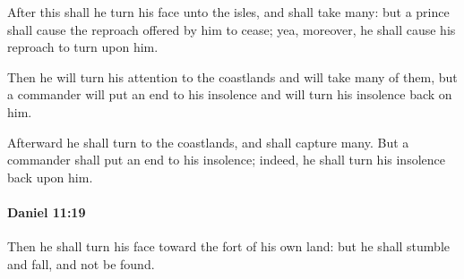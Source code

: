 			\begin{versebox}
					\item[BHS] 
					\item[LXX] 
					\item[ASV] After this shall he turn his face unto the isles, and shall take many: but a prince shall cause the reproach offered by him to cease; yea, moreover, he shall cause his reproach to turn upon him.
					\item[NIV] Then he will turn his attention to the coastlands and will take many of them, but a commander will put an end to his insolence and will turn his insolence back on him.
					\item[NRSV] Afterward he shall turn to the coastlands, and shall capture many. But a commander shall put an end to his insolence; indeed, he shall turn his insolence back upon him.
			\end{versebox}

		\paragraph{Daniel 11:19} %
			\label{DANIEL-11-19}

			Then he shall turn his face toward the fort of his own land: but he shall stumble and fall, and not be found.

